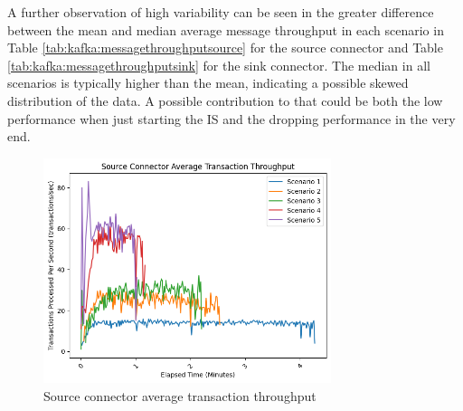 A further observation of high variability can be seen in the greater difference between the mean and median average message throughput in each scenario in Table \ref{tab:kafka:messagethroughputsource} for the source connector and Table \ref{tab:kafka:messagethroughputsink} for the sink connector. The median in all scenarios is typically higher than the mean, indicating a possible skewed distribution of the data. A possible contribution to that could be both the low performance when just starting the \ac{IS} and the dropping performance in the very end.


\begin{figure}[htbp]
    \centering
    \includegraphics[width=0.75\textwidth]{chapters/images/allscenarios/source-avg-runs-all-scenarios-transaction.png}
    \caption{Source connector average transaction throughput}
    \label{fig:chapter06:results:sourceallscenariostrans}
\end{figure}

